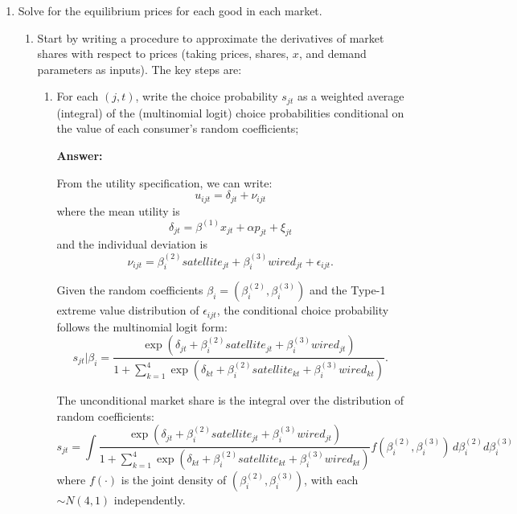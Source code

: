 \documentclass[english,11pt]{article}
\begin{document}
\begin{enumerate}
\item Solve for the equilibrium prices for each good in each market.

\begin{enumerate}
\item Start by writing a procedure to approximate the derivatives of market
shares with respect to prices (taking prices, shares, $x$, and demand
parameters as inputs). The key steps are:
\begin{enumerate}
\item For each $(j,t)$, write the choice probability $s_{jt}$ as a weighted
average (integral) of the (multinomial logit) choice probabilities
conditional on the value of each consumer's random coefficients; 

\textbf{Answer:}

From the utility specification, we can write:
\begin{equation*}
u_{ijt} = \delta_{jt} + \nu_{ijt}
\end{equation*}
where the mean utility is
\begin{equation*}
\delta_{jt} = \beta^{(1)}x_{jt} + \alpha p_{jt} + \xi_{jt}
\end{equation*}
and the individual deviation is
\begin{equation*}
\nu_{ijt} = \beta_i^{(2)}satellite_{jt} + \beta_i^{(3)}wired_{jt} + \epsilon_{ijt}.
\end{equation*}

Given the random coefficients $\beta_i = (\beta_i^{(2)}, \beta_i^{(3)})$ and the Type-1 extreme value distribution of $\epsilon_{ijt}$, the conditional choice probability follows the multinomial logit form:
\begin{equation*}
s_{jt}|\beta_i = \frac{\exp(\delta_{jt} + \beta_i^{(2)}satellite_{jt} + \beta_i^{(3)}wired_{jt})}{1 + \sum_{k=1}^4 \exp(\delta_{kt} + \beta_i^{(2)}satellite_{kt} + \beta_i^{(3)}wired_{kt})}.
\end{equation*}

The unconditional market share is the integral over the distribution of random coefficients:
\begin{equation*}
s_{jt} = \int \frac{\exp(\delta_{jt} + \beta_i^{(2)}satellite_{jt} + \beta_i^{(3)}wired_{jt})}{1 + \sum_{k=1}^4 \exp(\delta_{kt} + \beta_i^{(2)}satellite_{kt} + \beta_i^{(3)}wired_{kt})} f(\beta_i^{(2)}, \beta_i^{(3)}) \, d\beta_i^{(2)} d\beta_i^{(3)}
\end{equation*}
where $f(\cdot)$ is the joint density of $(\beta_i^{(2)}, \beta_i^{(3)})$, with each $\sim N(4,1)$ independently.



\end{enumerate}
\end{enumerate}
\end{enumerate}
\end{document}
